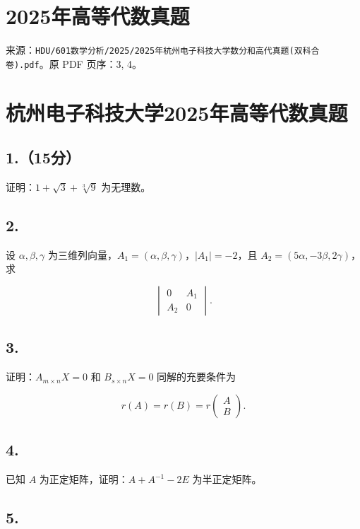 \documentclass[11pt,fontset=fandol]{ctexart}
\begin{document}
\section{2025年高等代数真题}\label{ux5e74ux9ad8ux7b49ux4ee3ux6570ux771fux9898}

来源：\texttt{HDU/601数学分析/2025/2025年杭州电子科技大学数分和高代真题(双科合卷).pdf}。原
PDF 页序：3, 4。

\section{杭州电子科技大学2025年高等代数真题}\label{ux676dux5ddeux7535ux5b50ux79d1ux6280ux5927ux5b662025ux5e74ux9ad8ux7b49ux4ee3ux6570ux771fux9898}

\subsection{1.（15分）}\label{ux5206}

证明：\(1+\sqrt3+\sqrt[3]9\) 为无理数。

\subsection{2.}\label{section}

设 \(\alpha,\beta,\gamma\)
为三维列向量，\(A_1=(\alpha,\beta,\gamma)\)，\(|A_1|=-2\)，且
\(A_2=(5\alpha,-3\beta,2\gamma)\)，求

\[
\begin{vmatrix}
0&A_1\\
A_2&0
\end{vmatrix}.
\]

\subsection{3.}\label{section-1}

证明：\(A_{m\times n}X=0\) 和 \(B_{s\times n}X=0\) 同解的充要条件为

\[
r(A)=r(B)=r\begin{pmatrix}A\\B\end{pmatrix}.
\]

\subsection{4.}\label{section-2}

已知 \(A\) 为正定矩阵，证明：\(A+A^{-1}-2E\) 为半正定矩阵。

\subsection{5.}\label{section-3}
\end{document}
